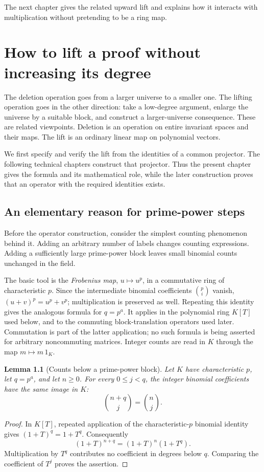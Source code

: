 \documentclass[11pt,a4paper,oneside,openany]{book}
\newtheorem{lemma}[theorem]{Lemma}
\theoremstyle{definition}\newtheorem{definition}[theorem]{Definition}
\theoremstyle{remark}\newtheorem{remark}[theorem]{Remark}
\numberwithin{equation}{chapter}
\begin{document}
The next chapter gives the related upward lift and explains how it
interacts with multiplication without pretending to be a ring map.

\chapter{How to lift a proof without increasing its degree}
\label{tx:chap:lift}
The deletion operation goes from a larger universe to a smaller one.
The lifting operation goes in the other direction: take a low-degree
argument, enlarge the universe by a suitable block, and construct
a larger-universe consequence. These are related viewpoints.
Deletion is an operation on entire invariant spaces and their maps.
The lift is an ordinary linear map on polynomial vectors.

We first specify and verify the lift from the identities of a common
projector. The following technical chapters construct that projector.
Thus the present chapter gives the formula and its mathematical role,
while the later construction proves that an operator with the required
identities exists.

\section{An elementary reason for prime-power steps}
Before the operator construction, consider the simplest counting
phenomenon behind it. Adding an arbitrary number of labels changes
counting expressions. Adding a sufficiently large prime-power block
leaves small binomial counts unchanged in the field.

The basic tool is the \emph{Frobenius map}, $u\mapsto u^p$, in a
commutative ring of characteristic $p$.
Since the intermediate binomial coefficients $\binom pi$ vanish,
$(u+v)^p=u^p+v^p$; multiplication is preserved as well.
Repeating this identity gives the analogous formula for $q=p^a$.
It applies in the polynomial ring $K[T]$ used below, and to the
commuting block-translation operators used later.
Commutation is part of the latter application; no such formula is
being asserted for arbitrary noncommuting matrices.
Integer counts are read in $K$ through the map $m\mapsto m\,1_K$.

\begin{lemma}[Counts below a prime-power block]\label{tx:lem:prime-counts}
Let $K$ have characteristic $p$, let $q=p^a$, and let $n\ge0$.
For every $0\le j<q$, the integer binomial coefficients have the same
image in $K$:
\[
                         \binom{n+q}{j}=\binom nj.
\]
\end{lemma}
\begin{proof}
In $K[T]$, repeated application of the characteristic-$p$ binomial
identity gives $(1+T)^q=1+T^q$. Consequently
\[
                  (1+T)^{n+q}=(1+T)^n(1+T^q).
\]
Multiplication by $T^q$ contributes no coefficient in degrees below
$q$. Comparing the coefficient of $T^j$ proves the assertion.
\end{proof}
\end{document}
